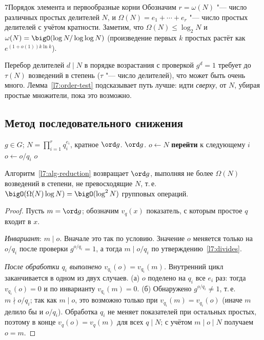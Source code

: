 \begin{lecture}{7}{Порядок элемента и первообразные корни}
Обозначим $r = \omega(N)$ "--- число различных простых делителей $N$, и
$\Omega(N) = e_1 + \cdots + e_r$ "--- число простых делителей с учётом кратности. Заметим, что
$\Omega(N) \le \log_2 N$ и $\omega(N) = \bigO(\log N / \log\log N)$ (произведение первых $k$
простых растёт как $e^{(1 + o(1)) k \ln k}$).

Перебор делителей $d \mid N$ в порядке возрастания с проверкой $g^d = 1$ требует до
$\tau(N)$ возведений в степень ($\tau$ "--- число делителей), что может быть очень много.
Лемма~\ref{l7:order-test} подсказывает путь лучше: идти \emph{сверху}, от $N$, убирая простые
множители, пока это возможно.

\subsection{Метод последовательного снижения}

\begin{algorithm}\label{l7:alg-reduction}
\begin{algorithmic}[1]
\Require $g \in G$; $N = \prod_{i=1}^r q_i^{e_i}$, кратное $\ord g$.
\Ensure $\ord g$.
\State $o \gets N$
     \State \textbf{перейти} к следующему $i$ \EndIf
    \State $o \gets o / q_i$
  \EndFor
\EndFor
\State \Return $o$
\end{algorithmic}
\end{algorithm}

\begin{theorem}\label{l7:reduction-correct}
Алгоритм~\ref{l7:alg-reduction} возвращает $\ord g$, выполняя не более $\Omega(N)$ возведений
в степени, не превосходящие $N$, т.\,е. $\bigO(\Omega(N) \log N) = \bigO(\log^2 N)$ групповых
операций.
\end{theorem}

\begin{proof}
Пусть $m = \ord g$; обозначим $v_q(x)$ показатель, с которым простое $q$ входит в $x$.

\emph{Инвариант}: $m \mid o$. Вначале это так по условию. Значение $o$ меняется только на
$o/q_i$ после проверки $g^{o/q_i} = 1$, а тогда $m \mid o/q_i$ по
утверждению~\ref{l7:divides}.

\emph{После обработки $q_i$ выполнено $v_{q_i}(o) = v_{q_i}(m)$.} Внутренний цикл
заканчивается в одном из двух случаев. (а) $o$ поделено на $q_i$ все $e_i$ раз: тогда
$v_{q_i}(o) = 0$ и по инварианту $v_{q_i}(m) = 0$. (б) Обнаружено $g^{o/q_i} \ne 1$, т.\,е.
$m \nmid o/q_i$; так как $m \mid o$, это возможно только при $v_{q_i}(m) = v_{q_i}(o)$ (иначе
$m$ делило бы и $o/q_i$). Обработка $q_i$ не меняет показателей при остальных простых, поэтому
в конце $v_q(o) = v_q(m)$ для всех $q \mid N$; с учётом $m \mid o \mid N$ получаем $o = m$.


\end{proof}
\end{lecture}
